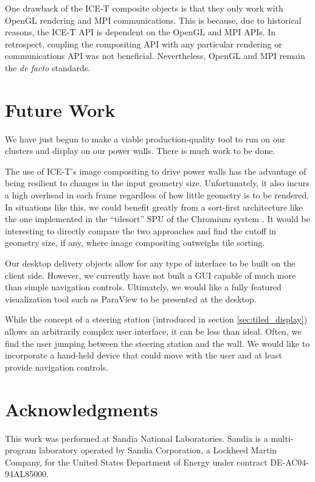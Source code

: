 \documentclass[twocolumn]{article}
\begin{document}
  One drawback of the ICE-T composite objects is that they only work with
  OpenGL rendering and MPI communications.  This is because, due to
  historical reasons, the ICE-T API is dependent on the OpenGL and MPI
  APIs.  In retrospect, coupling the compositing API with any particular
  rendering or communications API was not beneficial.  Nevertheless, OpenGL
  and MPI remain the \emph{de facto} standards.


  \section{Future Work}
  \label{sec:future_work}

  We have just begun to make a viable production-quality tool to run on our
  clusters and display on our power walls.  There is much work to be done.

  The use of ICE-T's image compositing to drive power walls has the
  advantage of being resilient to changes in the input geometry size.
  Unfortunately, it also incurs a high overhead in each frame regardless of
  how little geometry is to be rendered.  In situations like this, we could
  benefit greatly from a sort-first architecture like the one implemented
  in the ``tilesort'' SPU of the Chromium system \cite{Humphreys02}.  It
  would be interesting to directly compare the two approaches and find the
  cutoff in geometry size, if any, where image compositing outweighs tile
  sorting.

  Our desktop delivery objects allow for any type of interface to be built
  on the client side.  However, we currently have not built a GUI capable
  of much more than simple navigation controls.  Ultimately, we would like
  a fully featured visualization tool such as ParaView \cite{Law01} to be
  presented at the desktop.

  While the concept of a steering station (introduced in section
  \ref{sec:tiled_display}) allows an arbitrarily complex user interface, it
  can be less than ideal.  Often, we find the user jumping between the
  steering station and the wall.  We would like to incorporate a hand-held
  device that could move with the user and at least provide navigation
  controls.


  \section{Acknowledgments}

  This work was performed at Sandia National Laboratories.  Sandia is a
  multi-program laboratory operated by Sandia Corporation, a Lockheed
  Martin Company, for the United States Department of Energy under contract
  DE-AC04-94AL85000.


  
  
\end{document}
